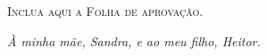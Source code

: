 

\newpage
\thispagestyle{empty}
\vspace*{\fill}
\begin{center}
    \textsc{Inclua aqui a Folha de aprovação.}
\end{center}
\vspace*{\fill}
\newpage
%	
\clearpage
\cleardoublepage

\begin{dedicatoria}
    \thispagestyle{empty}
		\vspace*{\fill}
    \centering
    \noindent
    \textit{À minha mãe, Sandra, e ao meu filho, Heitor.}
    \vspace*{\fill}
\end{dedicatoria}






